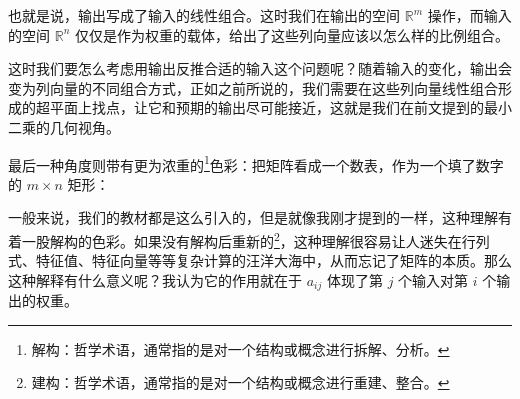 也就是说，输出写成了输入的线性组合。这时我们在输出的空间 $\mathbb{R}^m$ 操作，而输入的空间 $\mathbb{R}^n$ 仅仅是作为权重的载体，给出了这些列向量应该以怎么样的比例组合。

这时我们要怎么考虑用输出反推合适的输入这个问题呢？随着输入的变化，输出会变为列向量的不同组合方式，正如之前所说的，我们需要在这些列向量线性组合形成的超平面上找点，让它和预期的输出尽可能接近，这就是我们在前文提到的最小二乘的几何视角。

最后一种角度则带有更为浓重的\footnote{解构：哲学术语，通常指的是对一个结构或概念进行拆解、分析。}色彩：把矩阵看成一个数表，作为一个填了数字的 $m\times n$ 矩形：
\begin{figure}[H]
    \centering
\end{figure}

一般来说，我们的教材都是这么引入的，但是就像我刚才提到的一样，这种理解有着一股解构的色彩。如果没有解构后重新的\footnote{建构：哲学术语，通常指的是对一个结构或概念进行重建、整合。}，这种理解很容易让人迷失在行列式、特征值、特征向量等等复杂计算的汪洋大海中，从而忘记了矩阵的本质。那么这种解释有什么意义呢？我认为它的作用就在于 $a_{ij}$ 体现了第 $j$ 个输入对第 $i$ 个输出的权重。

